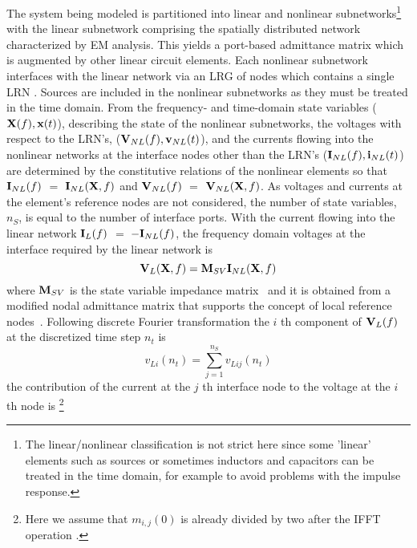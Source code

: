 The system being modeled is partitioned into linear and nonlinear
subnetworks\footnote{The linear/nonlinear classification is not strict
here since some 'linear' elements such as sources or sometimes
inductors and capacitors can be treated in the time domain, for
example to avoid problems with the impulse response.} with the linear
subnetwork comprising the spatially distributed network characterized
by EM analysis. This yields a port-based admittance matrix which is
augmented by other linear circuit elements. Each nonlinear subnetwork
interfaces with the linear network via an LRG of nodes which contains
a single LRN \cite{local:reference:node:khalil}.  Sources are included
in the nonlinear subnetworks as they must be treated in the time
domain.  From the frequency- and time-domain state variables (${\bf
X}(f), {\bf x}(t)$), describing the state of the nonlinear
subnetworks, the voltages with respect to the LRN's, (${\bf
V}_{NL}(f), {\bf v}_{NL}(t)$), and the currents flowing into the
nonlinear networks at the interface nodes other than the LRN's (${\bf
I}_{NL}(f), {\bf i}_{NL}(t)$) are determined by the constitutive
relations of the nonlinear elements so that ${\bf I}_{NL}(f)$ $=$
${\bf I}_{NL}({\bf X},f)$ and ${\bf V}_{NL}(f)$ $=$ ${\bf V}_{NL}({\bf
X},f)$.  As voltages and currents at the element's reference nodes are
not considered, the number of state variables, $n_S$, is equal to the
number of interface ports.  With the current flowing into the linear
network ${\bf I}_L(f)$ $=$ $-{\bf I}_{NL}(f)$, the frequency domain
voltages at the interface required by the linear network is
%
\begin{equation}
  {\bf V}_{L}({\bf X},f) = {\bf M}_{SV}{\bf I}_{NL}({\bf X},f) \label{eq.fd}
\end{equation}
%
where ${\bf M}_{SV}$ is the state variable impedance
matrix~\cite{ims99} and it is obtained from a modified nodal
admittance matrix that supports the concept of local reference
nodes~\cite{local:reference:node:christoffersen}.  Following discrete
Fourier transformation the $i$ th component of ${\bf V}_{L}(f)$ at the
discretized time step $n_t$ is
%
\begin{equation}
  v_{Li}(n_t) = \sum_{j=1}^{n_S} v_{Lij}(n_t)
\end{equation}
%
the contribution of the current at the $j$ th interface node to the
voltage at the $i$ th node is \cite{svtr}\footnote{Here we assume that
$m_{i,j}(0)$ is already divided by two after the IFFT operation
\cite{aplac}.}
%
